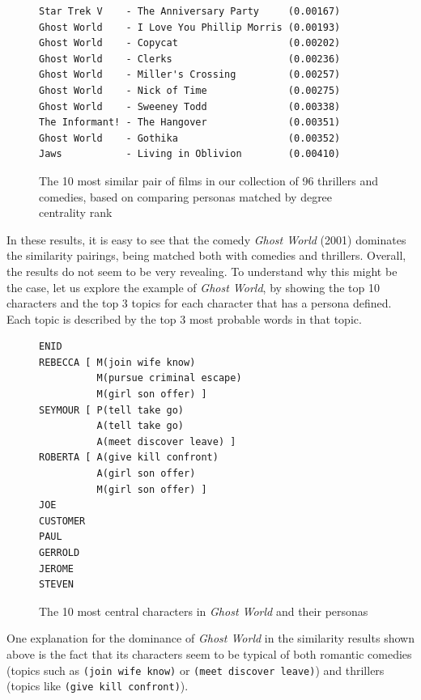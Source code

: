 \documentclass[bsc,frontabs,singlespacing,parskip, twoside]{infthesis}
\begin{document}
\begin{figure}[h]
\centering
\begin{minipage}{11.5cm}
\begin{Verbatim}[frame=single]
Star Trek V    - The Anniversary Party     (0.00167)
Ghost World    - I Love You Phillip Morris (0.00193)
Ghost World    - Copycat                   (0.00202)
Ghost World    - Clerks                    (0.00236)
Ghost World    - Miller's Crossing         (0.00257)
Ghost World    - Nick of Time              (0.00275)
Ghost World    - Sweeney Todd              (0.00338)
The Informant! - The Hangover              (0.00351)
Ghost World    - Gothika                   (0.00352)
Jaws           - Living in Oblivion        (0.00410)
\end{Verbatim}
\end{minipage}
\caption{The 10 most similar pair of films in our collection of 96 thrillers and comedies, based on comparing personas matched by degree centrality rank}
\end{figure}

In these results, it is easy to see that the comedy \textit{Ghost World} (2001) dominates the similarity pairings, being matched both with comedies and thrillers. Overall, the results do not seem to be very revealing. To understand why this might be the case, let us explore the example of \textit{Ghost World}, by showing the top 10 characters and the top 3 topics for each character that has a persona defined. Each topic is described by the top 3 most probable words in that topic.

\begin{figure}[h]
\centering
\begin{minipage}{9cm}
\begin{Verbatim}[frame=single]
ENID 
REBECCA [ M(join wife know)
          M(pursue criminal escape)
          M(girl son offer) ]
SEYMOUR [ P(tell take go)
          A(tell take go)
          A(meet discover leave) ]
ROBERTA [ A(give kill confront)
          A(girl son offer)
          M(girl son offer) ]
JOE 
CUSTOMER 
PAUL 
GERROLD 
JEROME 
STEVEN 
\end{Verbatim}

\end{minipage}
\caption{The 10 most central characters in \textit{Ghost World} and their personas}
\end{figure}

One explanation for the dominance of \textit{Ghost World} in the similarity results shown above is the fact that its characters seem to be typical of both romantic comedies (topics such as \texttt{(join wife know)} or \texttt{(meet discover leave)}) and thrillers (topics like \texttt{(give kill confront)}).
\end{document}

